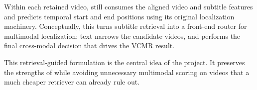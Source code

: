 Within each retained video, \xml still consumes the aligned video and subtitle features and predicts temporal start and end positions using its original localization machinery. Conceptually, this turns subtitle retrieval into a front-end router for multimodal localization: text narrows the candidate videos, and \xml performs the final cross-modal decision that drives the VCMR result.

This retrieval-guided formulation is the central idea of the project. It preserves the strengths of \xml while avoiding unnecessary multimodal scoring on videos that a much cheaper retriever can already rule out.
